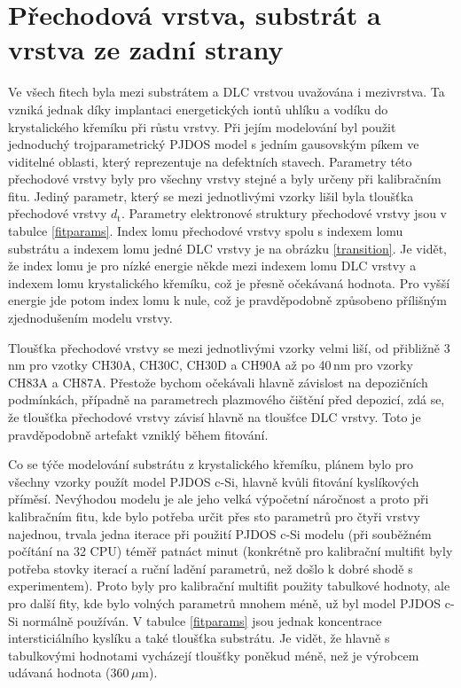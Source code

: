 \section{Přechodová vrstva, substrát a vrstva ze zadní strany}
Ve všech fitech byla mezi substrátem a DLC vrstvou uvažována i mezivrstva. Ta vzniká jednak díky implantaci energetických iontů uhlíku a vodíku do krystalického křemíku při růstu vrstvy. 
Při jejím modelování byl použit jednoduchý trojparametrický PJDOS model s jedním gausovským píkem ve viditelné oblasti, který reprezentuje na defektních stavech. 
Parametry této přechodové vrstvy byly pro všechny vrstvy stejné a byly určeny při kalibračním fitu. Jediný parametr, který se mezi jednotlivými vzorky lišil byla tloušťka přechodové vrstvy $d_\mathrm{t}$. 
Parametry elektronové struktury přechodové vrstvy jsou v tabulce \ref{fitparams}. Index lomu přechodové vrstvy spolu s indexem lomu substrátu a indexem lomu jedné DLC vrstvy je na obrázku \ref{transition}. 
Je vidět, že index lomu je pro nízké energie někde mezi indexem lomu DLC vrstvy a indexem lomu krystalického křemíku, což je přesně očekávaná hodnota. Pro vyšší energie jde potom index lomu k nule, což je pravděpodobně způsobeno přílišným zjednodušením modelu vrstvy.

Tloušťka přechodové vrstvy se mezi jednotlivými vzorky velmi liší, od přibližně 3\,nm pro vzotky CH30A, CH30C, CH30D a CH90A až po 40\,nm pro vzorky CH83A a CH87A. Přestože bychom očekávali hlavně závislost na depozičních podmínkách, případně na parametrech plazmového čištění před depozicí, zdá se, že tloušťka přechodové vrstvy závisí hlavně na tloušťce DLC vrstvy. Toto je pravděpodobně artefakt vzniklý během fitování.

Co se týče modelování substrátu z krystalického křemíku, plánem bylo pro všechny vzorky použít model PJDOS c-Si, hlavně kvůli fitování kyslíkových příměsí. Nevýhodou modelu je ale jeho velká výpočetní náročnost a proto při kalibračním fitu, kde bylo potřeba určit přes sto parametrů pro čtyři vrstvy najednou, trvala jedna iterace při použití PJDOS c-Si modelu (při souběžném počítání na 32 CPU) téměř patnáct minut (konkrétně pro kalibrační multifit byly potřeba stovky iterací a ruční ladění parametrů, než došlo k dobré shodě s experimentem). Proto byly pro kalibrační multifit použity tabulkové hodnoty, ale pro další fity, kde bylo volných parametrů mnohem méně, už byl model 
PJDOS c-Si normálně používán. V tabulce \ref{fitparams} jsou jednak koncentrace intersticiálního kyslíku a také tloušťka substrátu. Je vidět, že hlavně s tabulkovými hodnotami vycházejí tloušťky poněkud méně, než je výrobcem udávaná hodnota (360\,$\mu$m).

